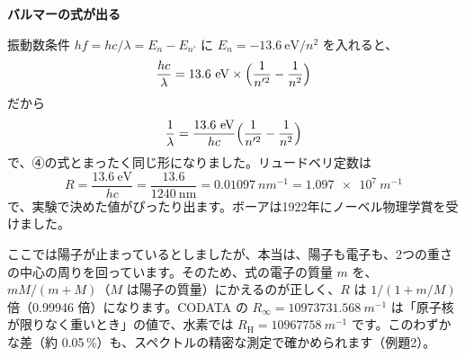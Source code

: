 \noindent\textbf{バルマーの式が出る}\par\nobreak
振動数条件 $hf=hc/\lambda=E_n-E_{n'}$ に $E_n=-13.6\ \text{eV}/n^2$ を入れると、
\[ \frac{hc}{\lambda}=13.6\ \mathrm{eV}\times\Bigl(\frac{1}{n'^2}-\frac{1}{n^2}\Bigr) \]
だから
\[ \frac{1}{\lambda}=\frac{13.6\ \mathrm{eV}}{hc}\Bigl(\frac{1}{n'^2}-\frac{1}{n^2}\Bigr) \]
で、④の式とまったく同じ形になりました。リュードベリ定数は
\[ R=\frac{13.6\ \mathrm{eV}}{hc}=\frac{13.6}{1240\ \mathrm{nm}}=\qty{0.01097}{nm^{-1}}=\qty{1.097e7}{m^{-1}} \]
で、実験で決めた値がぴったり出ます。ボーアは1922年にノーベル物理学賞を受けました。

\begin{seikaku}
ここでは陽子が止まっているとしましたが、本当は、陽子も電子も、2つの重さの中心の周りを回っています。そのため、式の電子の質量 $m$ を、$mM/(m+M)$（$M$ は陽子の質量）にかえるのが正しく、$R$ は $1/(1+m/M)$ 倍（0.99946 倍）になります。CODATA の $R_\infty=\qty{10973731.568}{m^{-1}}$ は「原子核が限りなく重いとき」の値で、水素では $R_{\mathrm H}=\qty{10967758}{m^{-1}}$ です。このわずかな差（約 0.05\,\%）も、スペクトルの精密な測定で確かめられます（例題2）。
\end{seikaku}

